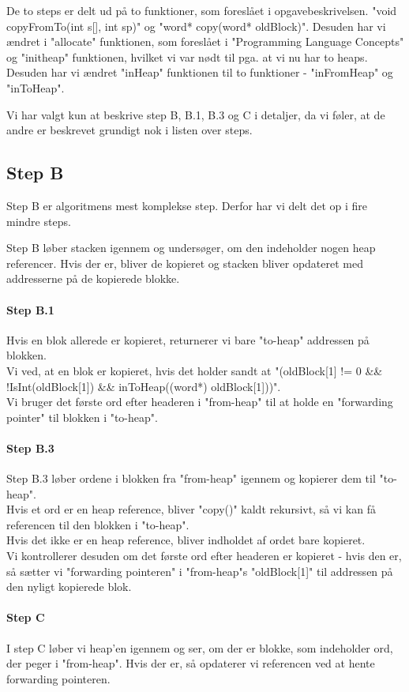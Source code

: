 De to steps er delt ud på to funktioner, som foreslået i opgavebeskrivelsen. "void copyFromTo(int s[], int sp)" og "word* copy(word* oldBlock)". Desuden har vi ændret i "allocate" funktionen, som foreslået i "Programming Language Concepts" og "initheap" funktionen, hvilket vi var nødt til pga. at vi nu har to heaps. Desuden har vi ændret "inHeap" funktionen til to funktioner - "inFromHeap" og "inToHeap".

Vi har valgt kun at beskrive step B, B.1, B.3 og C i detaljer, da vi føler, at de andre er beskrevet grundigt nok i listen over steps.
\subsection{Step B}
Step B er algoritmens mest komplekse step. Derfor har vi delt det op i fire mindre steps.

Step B løber stacken igennem og undersøger, om den indeholder nogen heap referencer. Hvis der er, bliver de kopieret og stacken bliver opdateret med addresserne på de kopierede blokke.
\paragraph{Step B.1}
Hvis en blok allerede er kopieret, returnerer vi bare "to-heap" addressen på blokken. 
\\Vi ved, at en blok er kopieret, hvis det holder sandt at "(oldBlock[1] != 0 \&\& !IsInt(oldBlock[1]) \&\& inToHeap((word*) oldBlock[1]))". 
\\Vi bruger det første ord efter headeren i "from-heap" til at holde en "forwarding pointer" til blokken i "to-heap".
\paragraph{Step B.3}
Step B.3 løber ordene i blokken fra "from-heap" igennem og kopierer dem til "to-heap". 
\\Hvis et ord er en heap reference, bliver "copy()" kaldt rekursivt, så vi kan få referencen til den blokken i "to-heap".
\\Hvis det ikke er en heap reference, bliver indholdet af ordet bare kopieret.
\\ Vi kontrollerer desuden om det første ord efter headeren er kopieret - hvis den er, så sætter vi "forwarding pointeren" i "from-heap"s "oldBlock[1]" til addressen på den nyligt kopierede blok.
\paragraph{Step C}
I step C løber vi heap'en igennem og ser, om der er blokke, som indeholder ord, der peger i "from-heap". Hvis der er, så opdaterer vi referencen ved at hente forwarding pointeren.
